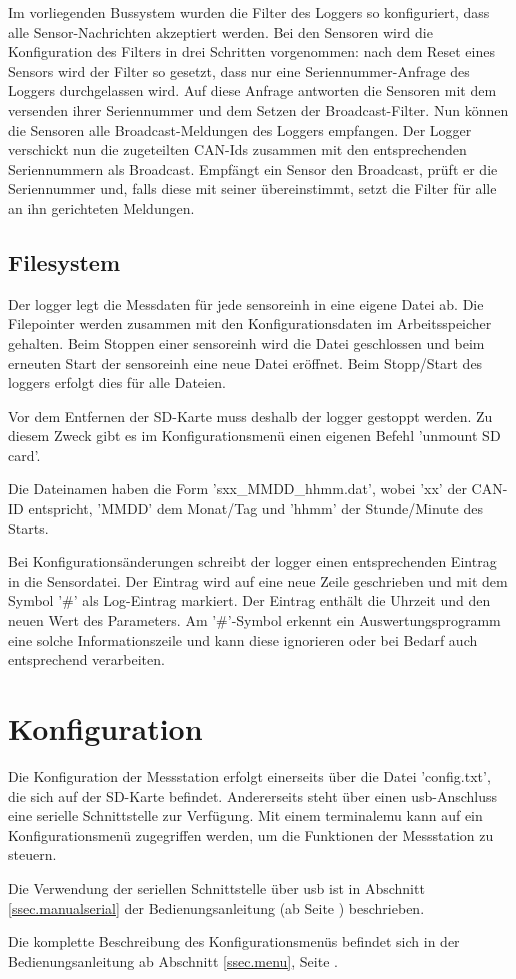 Im vorliegenden Bussystem wurden die Filter des Loggers so konfiguriert, dass alle Sensor-Nachrichten akzeptiert werden. Bei den Sensoren wird die Konfiguration des Filters in drei Schritten vorgenommen: nach dem Reset eines Sensors wird der Filter so gesetzt, dass nur eine Seriennummer-Anfrage des Loggers durchgelassen wird. Auf diese Anfrage antworten die Sensoren mit dem versenden ihrer Seriennummer und dem Setzen der Broadcast-Filter. Nun können die Sensoren alle Broadcast-Meldungen des Loggers empfangen. Der Logger verschickt nun die zugeteilten CAN-Ids zusammen mit den entsprechenden Seriennummern als Broadcast. Empfängt ein Sensor den Broadcast, prüft er die Seriennummer und, falls diese mit seiner übereinstimmt, setzt die Filter für alle an ihn gerichteten Meldungen.

\subsection{Filesystem}\label{subsec.sw_filesystem}
Der \gls{logger} legt die Messdaten für jede \gls{sensoreinh} in eine eigene Datei ab. Die Filepointer werden zusammen mit den Konfigurationsdaten im Arbeitsspeicher gehalten. Beim Stoppen einer \gls{sensoreinh} wird die Datei geschlossen und beim erneuten Start der \gls{sensoreinh} eine neue Datei eröffnet. Beim Stopp/Start des \gls{logger}s erfolgt dies für alle Dateien.

Vor dem Entfernen der SD-Karte muss deshalb der \gls{logger} gestoppt werden. Zu diesem Zweck gibt es im Konfigurationsmenü einen eigenen Befehl 'unmount SD card'.

Die Dateinamen haben die Form 'sxx\_MMDD\_hhmm.dat', wobei 'xx' der CAN-ID entspricht, 'MMDD' dem Monat/Tag und 'hhmm' der Stunde/Minute des Starts.

Bei Konfigurationsänderungen schreibt der \gls{logger} einen entsprechenden Eintrag in die Sensordatei. Der Eintrag wird auf eine neue Zeile geschrieben und mit dem Symbol '\#' als Log-Eintrag markiert. Der Eintrag enthält die Uhrzeit und den neuen Wert des Parameters. Am '\#'-Symbol erkennt ein Auswertungsprogramm eine solche Informationszeile und kann diese ignorieren oder bei Bedarf auch entsprechend verarbeiten.



\section{Konfiguration}\label{sec.sw_konfiguration}
Die Konfiguration der Messstation erfolgt einerseits über die Datei 'config.txt', die sich auf der SD-Karte befindet. Andererseits steht über einen \gls{usb}-Anschluss eine serielle Schnittstelle zur Verfügung. Mit einem \gls{terminalemu} kann auf ein Konfigurationsmenü zugegriffen werden, um die Funktionen der Messstation zu steuern.

Die Verwendung der seriellen Schnittstelle über \gls{usb} ist in Abschnitt \ref{ssec.manualserial} der Bedienungsanleitung (ab Seite \pageref{ssec.manualserial}) beschrieben.

Die komplette Beschreibung des Konfigurationsmenüs befindet sich in der Bedienungsanleitung ab Abschnitt \ref{ssec.menu}, Seite \pageref{ssec.menu}.
